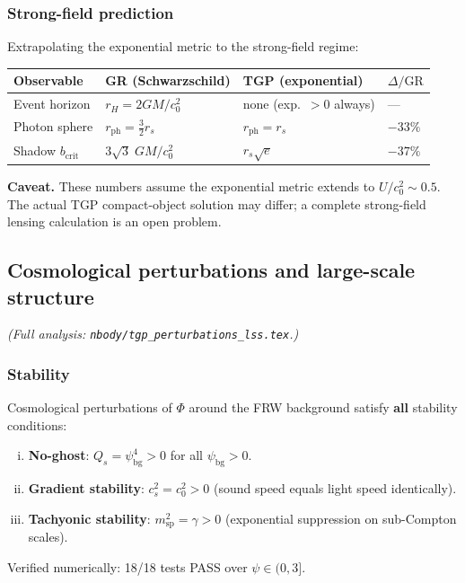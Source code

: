 \subsubsection{Strong-field prediction}

Extrapolating the exponential metric to the strong-field regime:

\begin{center}\small
\begin{tabular}{@{}llll@{}}
\toprule
\textbf{Observable} & \textbf{GR (Schwarzschild)} &
\textbf{TGP (exponential)} & $\Delta/\mathrm{GR}$ \\
\midrule
Event horizon   & $r_{H}=2GM/c_{0}^{2}$  & none (exp.\ $>0$ always) & --- \\
Photon sphere   & $r_{\mathrm{ph}}=\tfrac{3}{2}r_{s}$ & $r_{\mathrm{ph}}=r_{s}$ & $-33\%$ \\
Shadow $b_{\mathrm{crit}}$ & $3\sqrt{3}\;GM/c_{0}^{2}$ & $r_{s}\sqrt{e}$ & $-37\%$ \\
\bottomrule
\end{tabular}
\end{center}

\noindent
\textbf{Caveat.}  These numbers assume the exponential metric extends
to $U/c_{0}^{2}\sim 0.5$.  The actual TGP compact-object solution may
differ; a complete strong-field lensing calculation is an open problem.

\subsection{Cosmological perturbations and large-scale structure}%
\label{ssec:perturbations-summary}

\noindent\textit{(Full analysis: \texttt{nbody/tgp\_perturbations\_lss.tex}.)}

\subsubsection{Stability}

Cosmological perturbations of $\Phi$ around the FRW background
satisfy \textbf{all} stability conditions:
\begin{enumerate}[(i),nosep]
  \item \textbf{No-ghost}: $Q_{s}=\psi_{\mathrm{bg}}^{4}>0$
        for all $\psi_{\mathrm{bg}}>0$.
  \item \textbf{Gradient stability}: $c_{s}^{2}=c_{0}^{2}>0$
        (sound speed equals light speed identically).
  \item \textbf{Tachyonic stability}:
        $m_{\mathrm{sp}}^{2}=\gamma>0$ (exponential suppression on
        sub-Compton scales).
\end{enumerate}
Verified numerically: 18/18 tests PASS over $\psi\in(0,3]$.

